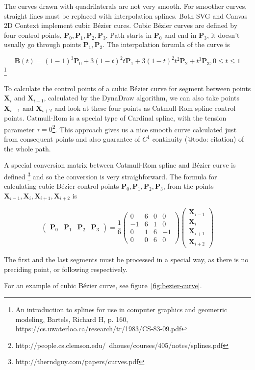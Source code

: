 The curves drawn with quadrilaterals are not very smooth. For smoother curves, straight lines must be replaced with interpolation splines. Both SVG and Canvas 2D Context implement cubic Bézier cures. Cubic Bézier curves are defined by four control points, $ \mathbf{P}_0, \mathbf{P}_1, \mathbf{P}_2, \mathbf{P}_3 $. Path starts in $ \mathbf{P}_0 $ and end in $ \mathbf{P}_3 $, it doesn't usually go through points $ \mathbf{P}_1, \mathbf{P}_2 $. The interpolation forumla of the curve is

$$ \mathbf{B}(t) = (1 - 1)^3 \mathbf{P}_0 + 3(1-t)^{2}t\mathbf{P}_1 + 3(1-t)^{2}t^2\mathbf{P}_2 + t^3\mathbf{P}_3, 0 \leq t \leq 1$$ \cite{}\footnote{An introduction to splines for use in computer graphics and geometric modeling, Bartels, Richard H, p. 160, https://cs.uwaterloo.ca/research/tr/1983/CS-83-09.pdf}

To calculate the control points of a cubic Bézier curve for segment between points $\mathbf{X}_i$ and $\mathbf{X}_{i+1}$, calculated by the DynaDraw algorithm, we can also take points $\mathbf{X}_{i-1}$ and $\mathbf{X}_{i+2}$ and look at these four points as Catmull-Rom spline control points. Catmull-Rom is a special type of Cardinal spline, with the tension parameter $\tau = 0$\cite{}\footnote{http://people.cs.clemson.edu/~dhouse/courses/405/notes/splines.pdf}. This approach gives us a nice smooth curve calculated just from consequent points and also guarantee of $C^1$ continuity (@todo: citation) of the whole path.

A special conversion matrix between Catmull-Rom spline and Bézier curve is defined \cite{}\footnote{http://therndguy.com/papers/curves.pdf} and so the conversion is very straighforward. The formula for calculating cubic Bézier control points $ \mathbf{P}_0, \mathbf{P}_1, \mathbf{P}_2, \mathbf{P}_3 $, from the points $ \mathbf{X}_{i-1}, \mathbf{X}_i, \mathbf{X}_{i+1}, \mathbf{X}_{i+2} $ is

$$
\begin{pmatrix}\mathbf{P}_0 & \mathbf{P}_1 & \mathbf{P}_{2} & \mathbf{P}_{3} \end{pmatrix} = \frac{1}{6}\begin{pmatrix} 0 & 6 & 0 & 0 \\ -1 & 6 & 1 & 0 \\ 0 & 1 & 6 & -1 \\ 0 & 0 & 6 & 0 \end{pmatrix} \begin{pmatrix} \mathbf{X}_{i-1} \\ \mathbf{X}_i \\ \mathbf{X}_{i+1} \\ \mathbf{X}_{i+2} \end{pmatrix}
$$

The first and the last segments must be processed in a special way, as there is no preciding point, or following respectively. 

For an example of cubic Bézier curve, see figure~\ref{fig:bezier-curve}.
